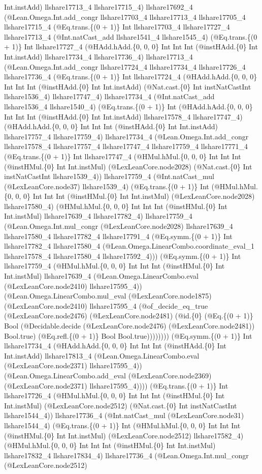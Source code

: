\documentclass[11pt]{article}
\begin{document}
Int.instAdd) llshare17713\_4 llshare17715\_4) llshare17692\_4 (@Lean.Omega.Int.add\_congr llshare17703\_4 llshare17713\_4 llshare17705\_4 llshare17715\_4 (@Eq.trans.\{(0 + 1)\} Int llshare17703\_4 llshare17727\_4 llshare17713\_4 (@Int.natCast\_add llshare1541\_4 llshare1545\_4) (@Eq.trans.\{(0 + 1)\} Int llshare17727\_4 (@HAdd.hAdd.\{0, 0, 0\} Int Int Int (@instHAdd.\{0\} Int Int.instAdd) llshare17734\_4 llshare17736\_4) llshare17713\_4 (@Lean.Omega.Int.add\_congr llshare17724\_4 llshare17734\_4 llshare17726\_4 llshare17736\_4 (@Eq.trans.\{(0 + 1)\} Int llshare17724\_4 (@HAdd.hAdd.\{0, 0, 0\} Int Int Int (@instHAdd.\{0\} Int Int.instAdd) (@Nat.cast.\{0\} Int instNatCastInt llshare1536\_4) llshare17747\_4) llshare17734\_4 (@Int.natCast\_add llshare1536\_4 llshare1540\_4) (@Eq.trans.\{(0 + 1)\} Int (@HAdd.hAdd.\{0, 0, 0\} Int Int Int (@instHAdd.\{0\} Int Int.instAdd) llshare17578\_4 llshare17747\_4) (@HAdd.hAdd.\{0, 0, 0\} Int Int Int (@instHAdd.\{0\} Int Int.instAdd) llshare17757\_4 llshare17759\_4) llshare17734\_4 (@Lean.Omega.Int.add\_congr llshare17578\_4 llshare17757\_4 llshare17747\_4 llshare17759\_4 llshare17771\_4 (@Eq.trans.\{(0 + 1)\} Int llshare17747\_4 (@HMul.hMul.\{0, 0, 0\} Int Int Int (@instHMul.\{0\} Int Int.instMul) (@LexLeanCore.node2028) (@Nat.cast.\{0\} Int instNatCastInt llshare1539\_4)) llshare17759\_4 (@Int.natCast\_mul (@LexLeanCore.node37) llshare1539\_4) (@Eq.trans.\{(0 + 1)\} Int (@HMul.hMul.\{0, 0, 0\} Int Int Int (@instHMul.\{0\} Int Int.instMul) (@LexLeanCore.node2028) llshare17580\_4) (@HMul.hMul.\{0, 0, 0\} Int Int Int (@instHMul.\{0\} Int Int.instMul) llshare17639\_4 llshare17782\_4) llshare17759\_4 (@Lean.Omega.Int.mul\_congr (@LexLeanCore.node2028) llshare17639\_4 llshare17580\_4 llshare17782\_4 llshare17791\_4 (@Eq.symm.\{(0 + 1)\} Int llshare17782\_4 llshare17580\_4 (@Lean.Omega.LinearCombo.coordinate\_eval\_1 llshare17578\_4 llshare17580\_4 llshare17592\_4))) (@Eq.symm.\{(0 + 1)\} Int llshare17759\_4 (@HMul.hMul.\{0, 0, 0\} Int Int Int (@instHMul.\{0\} Int Int.instMul) llshare17639\_4 (@Lean.Omega.LinearCombo.eval (@LexLeanCore.node2410) llshare17595\_4)) (@Lean.Omega.LinearCombo.mul\_eval (@LexLeanCore.node1875) (@LexLeanCore.node2410) llshare17595\_4 (@of\_decide\_eq\_true (@LexLeanCore.node2476) (@LexLeanCore.node2481) (@id.\{0\} (@Eq.\{(0 + 1)\} Bool (@Decidable.decide (@LexLeanCore.node2476) (@LexLeanCore.node2481)) Bool.true) (@Eq.refl.\{(0 + 1)\} Bool Bool.true)))))))) (@Eq.symm.\{(0 + 1)\} Int llshare17734\_4 (@HAdd.hAdd.\{0, 0, 0\} Int Int Int (@instHAdd.\{0\} Int Int.instAdd) llshare17813\_4 (@Lean.Omega.LinearCombo.eval (@LexLeanCore.node2371) llshare17595\_4)) (@Lean.Omega.LinearCombo.add\_eval (@LexLeanCore.node2369) (@LexLeanCore.node2371) llshare17595\_4)))) (@Eq.trans.\{(0 + 1)\} Int llshare17726\_4 (@HMul.hMul.\{0, 0, 0\} Int Int Int (@instHMul.\{0\} Int Int.instMul) (@LexLeanCore.node2512) (@Nat.cast.\{0\} Int instNatCastInt llshare1544\_4)) llshare17736\_4 (@Int.natCast\_mul (@LexLeanCore.node31) llshare1544\_4) (@Eq.trans.\{(0 + 1)\} Int (@HMul.hMul.\{0, 0, 0\} Int Int Int (@instHMul.\{0\} Int Int.instMul) (@LexLeanCore.node2512) llshare17582\_4) (@HMul.hMul.\{0, 0, 0\} Int Int Int (@instHMul.\{0\} Int Int.instMul) llshare17832\_4 llshare17834\_4) llshare17736\_4 (@Lean.Omega.Int.mul\_congr (@LexLeanCore.node2512) 
\end{document}
